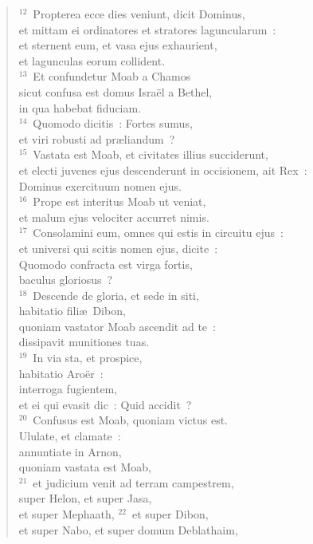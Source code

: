 \begin{verse}
${}^{12}$~Propterea ecce dies veniunt, dicit Dominus,\\ et mittam ei ordinatores et stratores laguncularum~:\\ et sternent eum, et vasa ejus exhaurient,\\ et lagunculas eorum collident.\\
${}^{13}$~Et confundetur Moab a Chamos\\ sicut confusa est domus Isra\"el a Bethel,\\ in qua habebat fiduciam.\\
${}^{14}$~Quomodo dicitis~: Fortes sumus,\\ et viri robusti ad pr\ae liandum~?\\
${}^{15}$~Vastata est Moab, et civitates illius succiderunt,\\ et electi juvenes ejus descenderunt in occisionem, ait Rex~:\\ Dominus exercituum nomen ejus.\\
${}^{16}$~Prope est interitus Moab ut veniat,\\ et malum ejus velociter accurret nimis.\\
${}^{17}$~Consolamini eum, omnes qui estis in circuitu ejus~:\\ et universi qui scitis nomen ejus, dicite~:\\ Quomodo confracta est virga fortis,\\ baculus gloriosus~?\\
${}^{18}$~Descende de gloria, et sede in siti,\\ habitatio fili\ae\ Dibon,\\ quoniam vastator Moab ascendit ad te~:\\ dissipavit munitiones tuas.\\
${}^{19}$~In via sta, et prospice,\\ habitatio Aro\"er~:\\ interroga fugientem,\\ et ei qui evasit dic~: Quid accidit~?\\
${}^{20}$~Confusus est Moab, quoniam victus est.\\ Ululate, et clamate~:\\ annuntiate in Arnon,\\ quoniam vastata est Moab,\\
${}^{21}$~et judicium venit ad terram campestrem,\\ super Helon, et super Jasa,\\ et super Mephaath,
${}^{22}$~et super Dibon,\\ et super Nabo, et super domum Deblathaim,\\

\end{verse}

